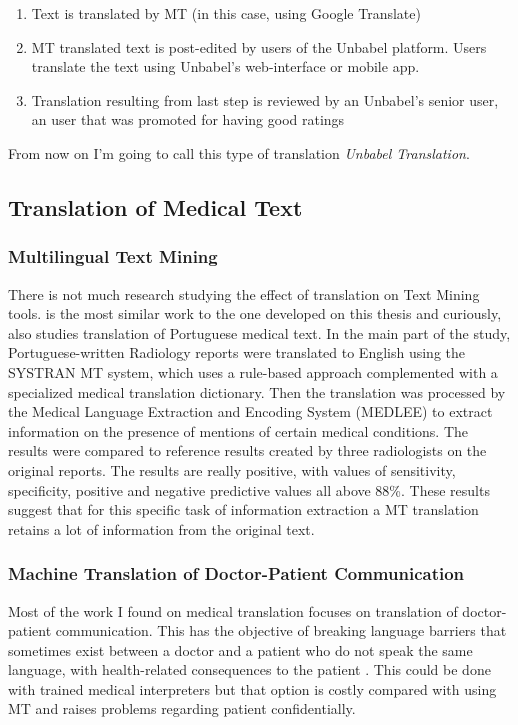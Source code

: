 \begin{enumerate}
\item Text is translated by MT (in this case, using Google Translate)
\item MT translated text is post-edited by users of the Unbabel platform. Users translate the text using Unbabel's web-interface or mobile app.
\item Translation resulting from last step is reviewed by an Unbabel's senior user, an user that was promoted for having good ratings
\end{enumerate}

From now on I'm going to call this type of translation \textit{Unbabel Translation}.


\subsection{Translation of Medical Text}

\subsubsection{Multilingual Text Mining}
\label{multilingual-text-mining}

There is not much research studying the effect of translation on Text Mining tools. \citep{Castilla2007a} is the most similar work to the one developed on this thesis and curiously, also studies translation of Portuguese medical text. In the main part of the study, Portuguese-written Radiology reports were translated to English using the SYSTRAN MT system, which uses a rule-based approach complemented with a specialized medical translation dictionary. Then the translation was processed by the Medical Language Extraction and Encoding System (MEDLEE) to extract information on the presence of mentions of certain medical conditions. The results were compared to reference results created by three radiologists on the original reports. The results are really positive, with values of sensitivity, specificity, positive and negative predictive values all above 88\%. These results suggest that for this specific task of information extraction a MT translation retains a lot of information from the original text.


\subsubsection{Machine Translation of Doctor-Patient Communication}

Most of the work I found on medical translation focuses on translation of doctor-patient communication. This has the objective of breaking language barriers that sometimes exist between a doctor and a patient who do not speak the same language, with health-related consequences to the patient \citep{Schyve2007}. This could be done with trained medical interpreters but that option is costly compared with using MT and raises problems regarding patient confidentially.


